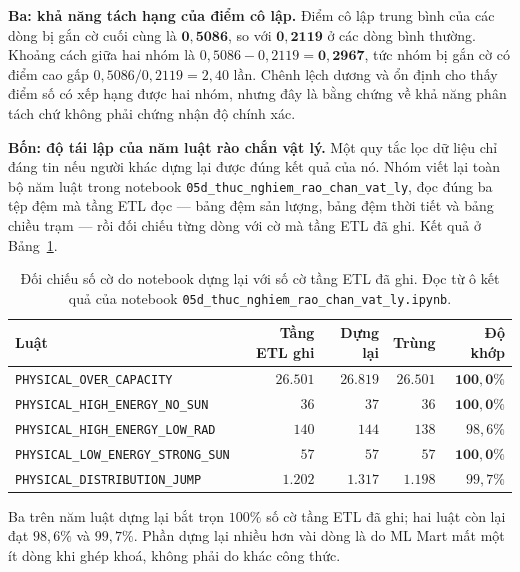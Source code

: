 \documentclass[12pt, a4paper]{report}
\begin{document}
\textbf{Ba: khả năng tách hạng của điểm cô lập.} Điểm cô lập trung bình của các dòng bị
gắn cờ cuối cùng là $\mathbf{0{,}5086}$, so với $\mathbf{0{,}2119}$ ở các dòng bình thường.
Khoảng cách giữa hai nhóm là $0{,}5086 - 0{,}2119 = \mathbf{0{,}2967}$, tức nhóm bị gắn cờ có
điểm cao gấp $0{,}5086 / 0{,}2119 = 2{,}40$ lần. Chênh lệch dương và ổn định cho thấy điểm số
có xếp hạng được hai nhóm, nhưng đây là bằng chứng về khả năng phân tách chứ không phải chứng
nhận độ chính xác.

\textbf{Bốn: độ tái lập của năm luật rào chắn vật lý.} Một quy tắc lọc dữ liệu chỉ đáng
tin nếu người khác dựng lại được đúng kết quả của nó. Nhóm viết lại toàn bộ năm luật trong
notebook \texttt{05d\_thuc\_nghiem\_rao\_chan\_vat\_ly}, đọc đúng ba tệp đệm mà tầng ETL đọc --- bảng
đệm sản lượng, bảng đệm thời tiết và bảng chiều trạm --- rồi đối chiếu từng dòng với cờ mà
tầng ETL đã ghi. Kết quả ở Bảng~\ref{tab:tai_lap_luat}.

\begin{table}[htbp]
\centering
\caption{Đối chiếu số cờ do notebook dựng lại với số cờ tầng ETL đã ghi. Đọc từ ô kết quả
của notebook \texttt{05d\_thuc\_nghiem\_rao\_chan\_vat\_ly.ipynb}.}
\label{tab:tai_lap_luat}
\small
\begin{tabular}{l r r r r}
\toprule
\textbf{Luật} & \textbf{Tầng ETL ghi} & \textbf{Dựng lại} & \textbf{Trùng} & \textbf{Độ khớp} \\
\midrule
\texttt{PHYSICAL\_OVER\_CAPACITY}          & $26.501$ & $26.819$ & $26.501$ & $\mathbf{100{,}0\%}$ \\
\texttt{PHYSICAL\_HIGH\_ENERGY\_NO\_SUN}   & $36$     & $37$     & $36$     & $\mathbf{100{,}0\%}$ \\
\texttt{PHYSICAL\_HIGH\_ENERGY\_LOW\_RAD}  & $140$    & $144$    & $138$    & $98{,}6\%$ \\
\texttt{PHYSICAL\_LOW\_ENERGY\_STRONG\_SUN}& $57$     & $57$     & $57$     & $\mathbf{100{,}0\%}$ \\
\texttt{PHYSICAL\_DISTRIBUTION\_JUMP}      & $1.202$  & $1.317$  & $1.198$  & $99{,}7\%$ \\
\bottomrule
\end{tabular}
\caption[Đối chiếu số cờ do notebook dựng lại với số cờ tầng ETL đã ghi]{Đối chiếu số cờ do notebook dựng lại với số cờ tầng ETL đã ghi. Đọc từ ô kết quả
của notebook \texttt{05d\_thuc\_nghiem\_rao\_chan\_vat\_ly.ipynb}.}
\label{tab:tai_lap_luat}
\end{table}

Ba trên năm luật dựng lại bắt trọn $100\%$ số cờ tầng ETL đã ghi; hai luật còn lại đạt
$98{,}6\%$ và $99{,}7\%$. Phần dựng lại nhiều hơn vài dòng là do ML Mart mất một ít dòng khi
ghép khoá, không phải do khác công thức.
\end{document}

